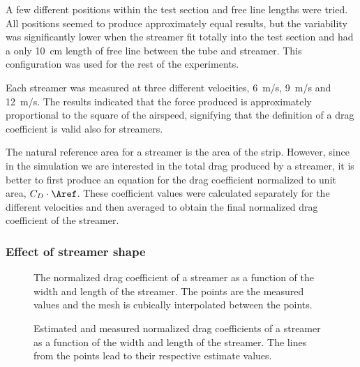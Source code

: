 A few different positions within the test section and free line
lengths were tried.  All positions seemed to produce approximately
equal results, but the variability was significantly lower when the
streamer fit totally into the test section and had a only 10~cm length
of free line between the tube and streamer.  This configuration was
used for the rest of the experiments.

Each streamer was measured at three different velocities, 6~m/s, 9~m/s
and 12~m/s.  The results indicated that the force produced is
approximately proportional to the square of the airspeed, signifying
that the definition of a drag coefficient is valid also for streamers.

The natural reference area for a streamer is the area of the strip.
However, since in the simulation we are interested in the total drag
produced by a streamer, it is better to first produce an equation for
the drag coefficient normalized to unit area, $C_D \cdot \Aref$.
These coefficient values were calculated separately for the different
velocities and then averaged to obtain the final normalized drag
coefficient of the streamer.


\subsubsection*{Effect of streamer shape}

\begin{figure}[p]
\centering
\hspace*{-7mm}
\caption{The normalized drag coefficient of a streamer as a function
  of the width and length of the streamer.  The points are the
  measured values and the mesh is cubically interpolated between the
  points.}
\label{fig-streamer-CD-vs-shape}
\end{figure}


\begin{figure}[p]
\centering
\hspace*{-7mm}
\caption{Estimated and measured normalized drag coefficients of a
  streamer as a function of the width and length of the streamer.  The
  lines from the points lead to their respective estimate values.}
\label{fig-streamer-shape-estimate}
\end{figure}



